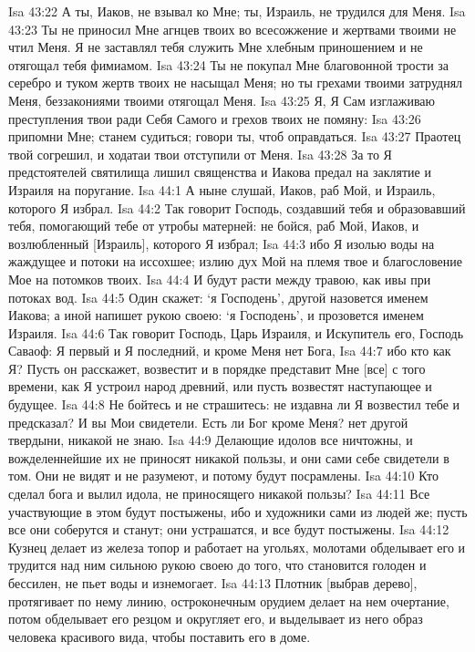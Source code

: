 Isa 43:22  А ты, Иаков, не взывал ко Мне; ты, Израиль, не трудился для Меня.
Isa 43:23  Ты не приносил Мне агнцев твоих во всесожжение и жертвами твоими не чтил Меня. Я не заставлял тебя служить Мне хлебным приношением и не отягощал тебя фимиамом.
Isa 43:24  Ты не покупал Мне благовонной трости за серебро и туком жертв твоих не насыщал Меня; но ты грехами твоими затруднял Меня, беззакониями твоими отягощал Меня.
Isa 43:25  Я, Я Сам изглаживаю преступления твои ради Себя Самого и грехов твоих не помяну:
Isa 43:26  припомни Мне; станем судиться; говори ты, чтоб оправдаться.
Isa 43:27  Праотец твой согрешил, и ходатаи твои отступили от Меня.
Isa 43:28  За то Я предстоятелей святилища лишил священства и Иакова предал на заклятие и Израиля на поругание.
Isa 44:1  А ныне слушай, Иаков, раб Мой, и Израиль, которого Я избрал.
Isa 44:2  Так говорит Господь, создавший тебя и образовавший тебя, помогающий тебе от утробы матерней: не бойся, раб Мой, Иаков, и возлюбленный [Израиль], которого Я избрал;
Isa 44:3  ибо Я изолью воды на жаждущее и потоки на иссохшее; излию дух Мой на племя твое и благословение Мое на потомков твоих.
Isa 44:4  И будут расти между травою, как ивы при потоках вод.
Isa 44:5  Один скажет: `я Господень', другой назовется именем Иакова; а иной напишет рукою своею: `я Господень', и прозовется именем Израиля.
Isa 44:6  Так говорит Господь, Царь Израиля, и Искупитель его, Господь Саваоф: Я первый и Я последний, и кроме Меня нет Бога,
Isa 44:7  ибо кто как Я? Пусть он расскажет, возвестит и в порядке представит Мне [все] с того времени, как Я устроил народ древний, или пусть возвестят наступающее и будущее.
Isa 44:8  Не бойтесь и не страшитесь: не издавна ли Я возвестил тебе и предсказал? И вы Мои свидетели. Есть ли Бог кроме Меня? нет другой твердыни, никакой не знаю.
Isa 44:9  Делающие идолов все ничтожны, и вожделеннейшие их не приносят никакой пользы, и они сами себе свидетели в том. Они не видят и не разумеют, и потому будут посрамлены.
Isa 44:10  Кто сделал бога и вылил идола, не приносящего никакой пользы?
Isa 44:11  Все участвующие в этом будут постыжены, ибо и художники сами из людей же; пусть все они соберутся и станут; они устрашатся, и все будут постыжены.
Isa 44:12  Кузнец делает из железа топор и работает на угольях, молотами обделывает его и трудится над ним сильною рукою своею до того, что становится голоден и бессилен, не пьет воды и изнемогает.
Isa 44:13  Плотник [выбрав дерево], протягивает по нему линию, остроконечным орудием делает на нем очертание, потом обделывает его резцом и округляет его, и выделывает из него образ человека красивого вида, чтобы поставить его в доме.
